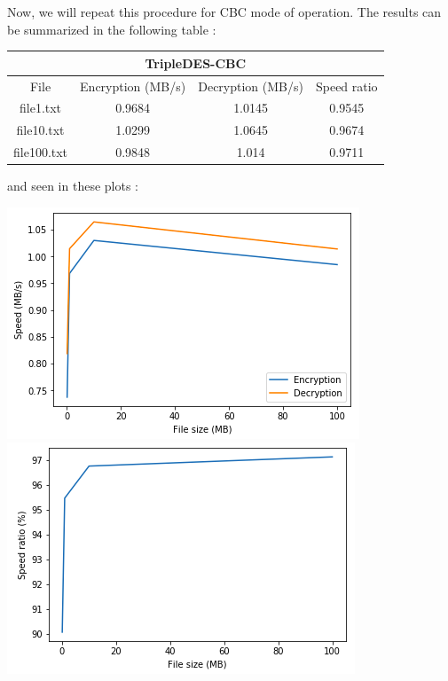 \documentclass[11pt]{article}
\begin{document}
Now, we will repeat this procedure for CBC mode of operation. The results can be summarized in the following table :
\begin{center}
\begin{tabular}{| c | c | c | c |}
\hline
\multicolumn{4}{|c|}{TripleDES-CBC} \\
\hline
File & Encryption (MB/s) & Decryption (MB/s) & Speed ratio\\
\hline
file1.txt & 0.9684 & 1.0145 & 0.9545 \\
\hline
file10.txt & 1.0299 & 1.0645 & 0.9674 \\
\hline
file100.txt & 0.9848 & 1.014 & 0.9711 \\
\hline
\end{tabular}
\end{center}
and seen in these plots :
\begin{center}
\includegraphics[scale=0.45]{./enc_dec_speed_3des_cbc.png}
\includegraphics[scale=0.45]{./avg_speed_ratio_3des_cbc.png}
\end{center}
\end{document}
